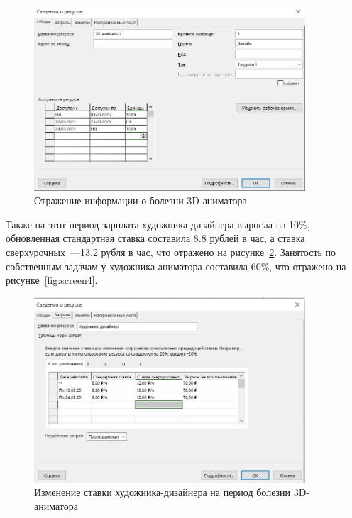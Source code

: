 \begin{figure}[H]
	\centering
	\includegraphics[width=0.9\textwidth]{img/screen2.jpg}
	\caption{Отражение информации о болезни 3D-аниматора}
	\label{fig:screen2}
\end{figure}

Также на этот период зарплата художника-дизайнера выросла на 10\%, обновленная стандартная ставка составила 8.8 рублей в час, а ставка сверхурочных~---13.2 рубля в час, что отражено на рисунке~\ref{fig:screen3}.
Занятость по собственным задачам у художника-аниматора составила 60\%, что отражено на рисунке~\ref{fig:screen4}.

\begin{figure}[H]
	\centering
	\includegraphics[width=0.9\textwidth]{img/screen3.jpg}
	\caption{Изменение ставки художника-дизайнера на период болезни 3D-аниматора}
	\label{fig:screen3}
\end{figure}


